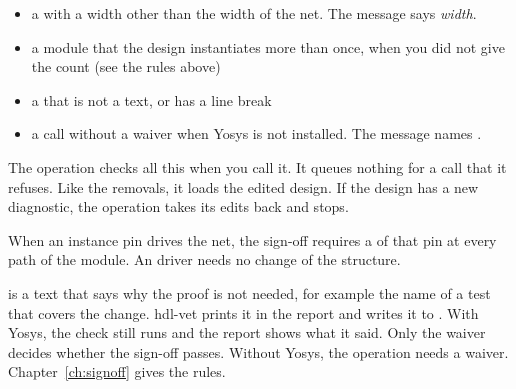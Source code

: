 \begin{entry}{}
\begin{itemize}
    through the other pins of that instance (chapter~\ref{ch:limits}).
  \item a  with a width other than the width of the net. The message says
    \emph{width}.
  \item a module that the design instantiates more than once, when you did not give the
    count (see the rules above)
  \item a  that is not a text, or has a line break
  \item a call without a waiver when Yosys is not installed. The message names
    .
  \end{itemize}
  The operation checks all this when you call it. It queues nothing for a call that it
  refuses. Like the removals, it loads the edited design. If the design has a new
  diagnostic, the operation takes its edits back and stops.
\item[Sign-off requires] When an instance pin drives the net, the sign-off requires a
   of that pin at every path of the module. An 
  driver needs no change of the structure.
\item[Waiver]  is a text that says why the proof is not needed, for example
  the name of a test that covers the change. hdl-vet prints it in the report and writes it
  to . With Yosys, the check still runs and the report shows what it said. Only the waiver
  decides whether the sign-off passes. Without Yosys, the operation needs a waiver.
  Chapter~\ref{ch:signoff} gives the rules.


\end{entry}
